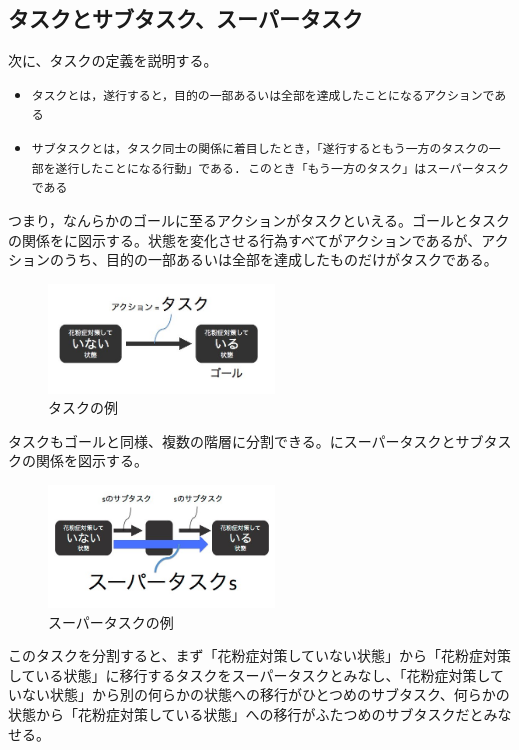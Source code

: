 \documentclass[submit,techreq]{ipsj}
\def\|{\verb|}
\begin{document}
%2.2
\subsection{タスクとサブタスク、スーパータスク}
\label{task_and_goal}


次に、タスクの定義を説明する。

\begin{itemize}

\item \|タスクとは，遂行すると，目的の一部あるいは全部を達成したことになるアクションである|
\item \|サブタスクとは，タスク同士の関係に着目したとき，「遂行するともう一方のタスクの一部を遂行したことになる行動」である. このとき「もう一方のタスク」はスーパータスクである|
\end{itemize}

つまり，なんらかのゴールに至るアクションがタスクといえる。ゴールとタスクの関係をに図示する。状態を変化させる行為すべてがアクションであるが、アクションのうち、目的の一部あるいは全部を達成したものだけがタスクである。


\begin{figure}[tb]
\includegraphics[width=6cm, bb=0 0 400 300]{action_task.jpg}
\caption{タスクの例}
\label{fig:action_task}
\end{figure}


タスクもゴールと同様、複数の階層に分割できる。にスーパータスクとサブタスクの関係を図示する。

\begin{figure}[tb]
\includegraphics[width=6cm, bb=0 0 400 300]{super_task.jpg}
\caption{スーパータスクの例}
\label{fig:super_task}
\end{figure}

このタスクを分割すると、まず「花粉症対策していない状態」から「花粉症対策している状態」に移行するタスクをスーパータスクとみなし、「花粉症対策していない状態」から別の何らかの状態への移行がひとつめのサブタスク、何らかの状態から「花粉症対策している状態」への移行がふたつめのサブタスクだとみなせる。
\end{document}
